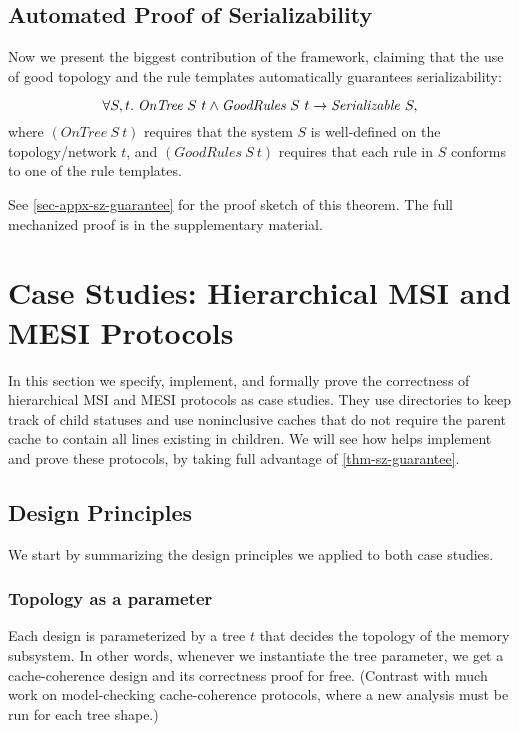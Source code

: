\documentclass[sigplan,10pt,review,anonymous,screen]{acmart}\settopmatter{printfolios=true,printccs=false,printacmref=false}
\begin{document}
\subsection{Automated Proof of Serializability}

\newcommand{\ontree}[2]{\ensuremath{\textit{OnTree}\ #1\ #2}}
\newcommand{\goodrules}[2]{\ensuremath{\textit{GoodRules}\ #1\ #2}}

Now we present the biggest contribution of the \hemiola{} framework, claiming that the use of good topology and the rule templates automatically guarantees serializability:
\begin{theorem}
  \begin{displaymath}
    \forall S, t.\; \ontree{S}{t} \land \goodrules{S}{t} \to \hsrz{S},
  \end{displaymath}
  where $(\ontree{S}{t})$ requires that the system $S$ is well-defined on the topology/network $t$, and $(\goodrules{S}{t})$ requires that each rule in $S$ conforms to one of the rule templates.
  \label{thm-sz-guarantee}
\end{theorem}
See \autoref{sec-appx-sz-guarantee} for the proof sketch of this theorem.
The full mechanized proof is in the supplementary material.

\section{Case Studies: Hierarchical MSI and MESI Protocols}
\label{sec-case-study}

In this section we specify, implement, and formally prove the correctness of hierarchical MSI and MESI protocols as case studies.
They use directories to keep track of child statuses and use noninclusive caches that do not require the parent cache to contain all lines existing in children.
We will see how \hemiola{} helps implement and prove these protocols, by taking full advantage of \autoref{thm-sz-guarantee}.

\subsection{Design Principles}
We start by summarizing the design principles we applied to both case studies.

\subsubsection{Topology as a parameter}
\label{sec-topo-param}
Each design is parameterized by a tree $t$ that decides the topology of the memory subsystem.
In other words, whenever we instantiate the tree parameter, we get a cache-coherence design and its correctness proof for free.
(Contrast with much work on model-checking cache-coherence protocols, where a new analysis must be run for each tree shape.)
\end{document}
